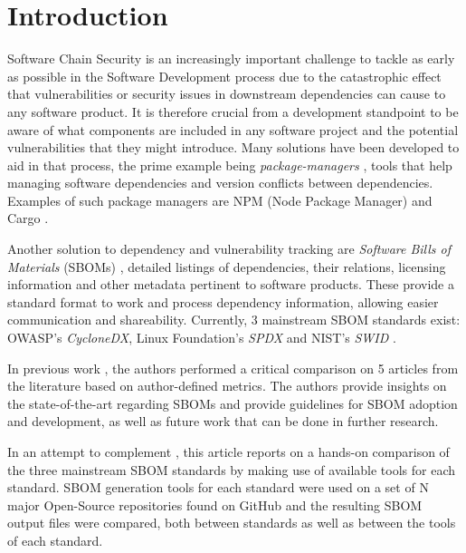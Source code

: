 \section{Introduction}

Software Chain Security is an increasingly important challenge to tackle as early as possible in the Software Development process due to the catastrophic effect that vulnerabilities or security issues in downstream dependencies can cause to any software product. \needsRef It is therefore crucial from a development standpoint to be aware of what components are included in any software project and the potential vulnerabilities that they might introduce.
Many solutions have been developed to aid in that process, the prime example being \emph{package-managers} \cite{article:package-manager}, tools that help managing software dependencies and version conflicts between dependencies. Examples of such package managers are NPM (Node Package Manager) and Cargo \cite{tools:pkg-mngr:npm,tools:pkg-mngr:cargo}.

Another solution to dependency and vulnerability tracking are \emph{Software Bills of Materials} (SBOMs) \cite{article:concept:sbom-2}, detailed listings of dependencies, their relations, licensing information and other metadata pertinent to software products. These provide a standard format to work and process dependency information, allowing easier communication and shareability.
Currently, 3 mainstream SBOM standards exist: OWASP's \emph{CycloneDX}, Linux Foundation's \emph{SPDX} and NIST's \emph{SWID} \cite{standards:sbom:cyclonedx,standards:sbom:spdx,standards:sbom:swid}.

In previous work \cite{article:concept:sbom-sota-review}, the authors performed a critical comparison on 5 articles from the literature \cite{article:business-sbom,article:software-bom,article:sbom-required,article:sbom-study,article:sboms-issues-solutions} based on author-defined metrics. The authors provide insights on the state-of-the-art regarding SBOMs and provide guidelines for SBOM adoption and development, as well as future work that can be done in further research. 

In an attempt to complement \cite{article:concept:sbom-sota-review}, this article reports on a hands-on comparison of the three mainstream SBOM standards by making use of available tools for each standard. SBOM generation tools for each standard were used on a set of N major Open-Source repositories found on GitHub and the resulting SBOM output files were compared, both between standards as well as between the tools of each standard.